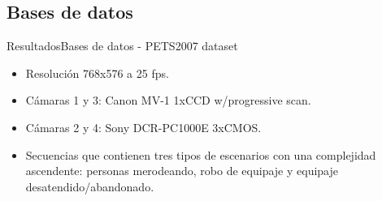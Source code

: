 \subsection{Bases de datos}

\begin{frame}{Resultados}{Bases de datos - PETS2007 dataset}

\begin{itemize}
    \justifying
    \item Resolución 768x576 a 25 fps.
    \item Cámaras 1 y 3: Canon MV-1 1xCCD w/progressive scan.
    \item Cámaras 2 y 4: Sony DCR-PC1000E 3xCMOS.
    \item Secuencias que contienen tres tipos de escenarios con una complejidad ascendente: personas merodeando, robo de equipaje y equipaje desatendido/abandonado.
\end{itemize}

\vspace{0.1cm}


\end{frame}
